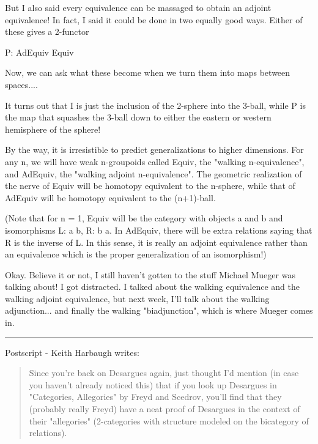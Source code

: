 But I also said every equivalence can be massaged to obtain an adjoint
equivalence!  In fact, I said it could be done in two equally good ways.
Either of these gives a 2-functor

P: AdEquiv \to  Equiv

Now, we can ask what these become when we turn them into maps between
spaces....

It turns out that I is just the inclusion of the 2-sphere into the
3-ball, while P is the map that squashes the 3-ball down to either the
eastern or western hemisphere of the sphere!  

By the way, it is irresistible to predict generalizations to higher
dimensions.  For any n, we will have weak n-groupoids called Equiv, the
"walking n-equivalence", and AdEquiv, the "walking adjoint
n-equivalence".  The geometric realization of the nerve of Equiv will be
homotopy equivalent to the n-sphere, while that of AdEquiv will be
homotopy equivalent to the (n+1)-ball.

(Note that for n = 1, Equiv will be the category with objects
a and b and isomorphisms L: a \to  b, R: b \to  a.   In AdEquiv, there
will be extra relations saying that R is the inverse of L.  In
this sense, it is really an adjoint equivalence rather than an
equivalence which is the proper generalization of an isomorphism!)

Okay.  Believe it or not, I still haven't gotten to the stuff Michael
Mueger was talking about!  I got distracted.   I talked about the
walking equivalence and the walking adjoint equivalence, but next week,
I'll talk about the walking adjunction... and finally the walking
"biadjunction", which is where Mueger comes in.

\par\noindent\rule{\textwidth}{0.4pt}
Postscript - Keith Harbaugh writes:
\begin{quote}
Since you're back on Desargues again, just thought I'd mention
(in case you haven't already noticed this)
that if you look up Desargues in "Categories, Allegories"
by Freyd and Scedrov,
you'll find that they (probably really Freyd)
have a neat proof of Desargues in the context of their "allegories"
(2-categories with structure modeled on the bicategory of relations).
\end{quote}

